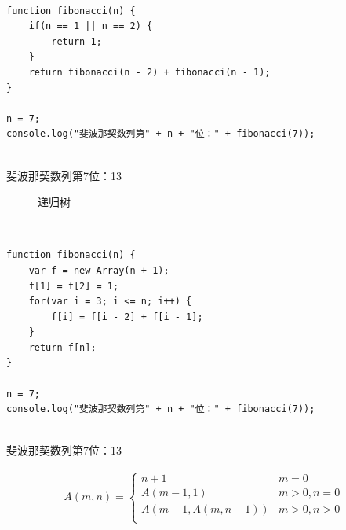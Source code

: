  \\

\begin{lstlisting}[style=htmlcssjs]
function fibonacci(n) {
    if(n == 1 || n == 2) {
        return 1;
    }
    return fibonacci(n - 2) + fibonacci(n - 1);
}

n = 7;
console.log("斐波那契数列第" + n + "位：" + fibonacci(7));
\end{lstlisting}

\begin{tcolorbox}
	 \\
	斐波那契数列第7位：13
\end{tcolorbox}

\begin{figure}[H]
	\centering
	\caption{递归树}
\end{figure}

 \\

\begin{lstlisting}[style=htmlcssjs]
function fibonacci(n) {
    var f = new Array(n + 1);
    f[1] = f[2] = 1;
    for(var i = 3; i <= n; i++) {
        f[i] = f[i - 2] + f[i - 1];
    }
    return f[n];
}

n = 7;
console.log("斐波那契数列第" + n + "位：" + fibonacci(7));
\end{lstlisting}

\begin{tcolorbox}
	 \\
	斐波那契数列第7位：13
\end{tcolorbox}


\begin{align}\nonumber
	A(m, n) =
	\begin{cases}
		n + 1             & m = 0        \\
		A(m-1, 1)         & m > 0, n = 0 \\
		A(m-1, A(m, n-1)) & m > 0, n > 0 \\
	\end{cases}
\end{align}

